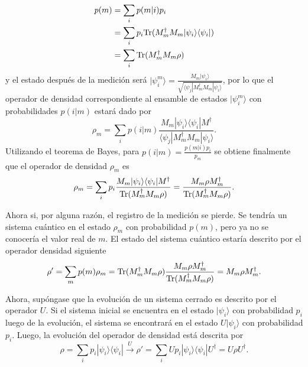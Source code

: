 \begin{equation}
	\label{probabilidad_m}
	\begin{split}
	p(m) &= \sum_{i}p(m|i)p_i\\
	&=\sum_i p_i{\rm Tr}(M_m^{\dagger} M_m |\psi_i\rangle \langle\psi_i|)\\
	&=\sum_{i}{\rm Tr}(M_m^{\dagger} M_m \rho)
	\end{split}
\end{equation} y el estado después de la medición será $|\psi_i^m\rangle=\frac{M_m|\psi_i\rangle}{\sqrt{\langle\psi_j|M_m^{\dagger}M_m|\psi_i\rangle}}$, por lo que el operador de densidad correspondiente al ensamble de estados $|\psi_i^m\rangle$ con probabilidades $p(i|m)$ estará dado por \[\rho_m=\sum_i p(i|m)\frac{M_m|\psi_i\rangle \langle \psi_i|M^{\dagger}}{\langle\psi_j|M_m^{\dagger}M_m|\psi_i\rangle}.\] Utilizando el teorema de Bayes, para $p(i|m)=\frac{p(m|i)p_i}{p_m}$ se obtiene finalmente que el operador de densidad $\rho_m$ es{\cite{nielsen_chuang_2010}} \begin{equation}
	\rho_m=\sum_i p_i \dfrac{M_m|\psi_i\rangle \langle \psi_i|M^{\dagger}}{{\rm Tr}(M^{\dagger}_m M_m \rho )}=\dfrac{M_m \rho M_m^{\dagger}}{{\rm Tr} (M^{\dagger}_m M_m\rho )}.
\end{equation}


Ahora si, por alguna razón, el registro de la medición se pierde. Se tendría un sistema cuántico en el estado $\rho_m$ con probabilidad $p(m)$, pero ya no se conocería el valor real de $m$. El estado del sistema cuántico estaría descrito por el operador densidad siguiente \begin{equation}
	\rho'=\sum_m p(m)\rho_m={\rm Tr}(M^{\dagger}_m M_m\rho )\dfrac{M_m\rho M_m^{\dagger}}{{\rm Tr} (M^{\dagger}_m M_m \rho )}=M_m\rho M_m^{\dagger}.
\end{equation}


 
 Ahora, supóngase que la evolución de un sistema cerrado es descrito por el operador $U$. Si el sistema inicial se encuentra en el estado $|\psi_i\rangle$ con probabilidad $p_i$ luego de la evolución, el sistema se encontrará en el estado $U|\psi_i\rangle$ con probabilidad $p_i$. Luego, la evolución del operador de densidad está descrita por {\cite{nielsen_chuang_2010}}\[\rho=\sum_{i}p_i|\psi_i\rangle \langle \psi_i|\xrightarrow{U}\rho'=\sum_{i}Up_i|\psi_i\rangle \langle \psi_i|U^{\dagger}=U\rho U^{\dagger}.\]


